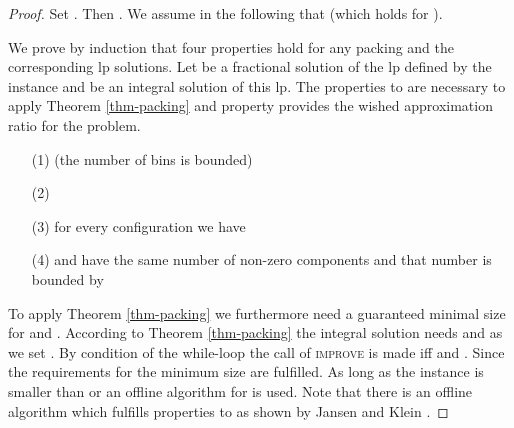 \begin{proof}
Set . Then . We assume in the following that  (which holds for ).

We prove by induction that four properties hold for any packing  and the corresponding \ac{lp} solutions. Let  be a fractional solution of the \ac{lp} defined by the instance  and  be an integral solution of this \ac{lp}.
    The properties  to  are necessary to apply Theorem \ref{thm-packing} and property  provides the wished approximation ratio for the \BP problem.
	\begin{enumerate}
		\item[(1)\label{prop:1}]  (the number of bins is bounded)
		\item[(2)\label{prop:2}] 
		\item[(3)\label{prop:3}] for every configuration  we have 
		\item[(4)\label{prop:4}]  and  have the same number of non-zero components and that number is bounded by 
	\end{enumerate}
	To apply Theorem \ref{thm-packing} we furthermore need a guaranteed minimal size for  and .
	According to Theorem \ref{thm-packing} the integral solution  needs  and 
	 as we set .
	By condition of the while-loop the call of \textsc{improve} is made iff  and . Since  the requirements for the minimum size are fulfilled. As long as the instance is smaller than  or  an offline algorithm for \BP is used. Note that there is an offline algorithm which fulfills properties  to  as shown by Jansen and Klein \cite{jansen2013binpacking}.
	

\end{proof}

